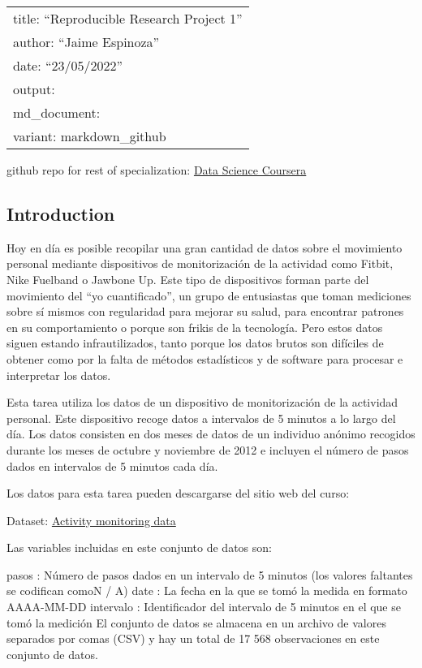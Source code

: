 \documentclass[
]{article}
\author{}
\date{\vspace{-2.5em}}
\begin{document}
\begin{longtable}[]{@{}l@{}}
\toprule
\endhead
title: ``Reproducible Research Project 1'' \\
author: ``Jaime Espinoza'' \\
date: ``23/05/2022'' \\
output: \\
md\_document: \\
variant: markdown\_github \\
\bottomrule
\end{longtable}

github repo for rest of specialization:
\href{https://github.com/jcespinoza2022/datasciencecoursera}{Data
Science Coursera}

\hypertarget{introduction}{%
\subsection{Introduction}\label{introduction}}

Hoy en día es posible recopilar una gran cantidad de datos sobre el
movimiento personal mediante dispositivos de monitorización de la
actividad como Fitbit, Nike Fuelband o Jawbone Up. Este tipo de
dispositivos forman parte del movimiento del ``yo cuantificado'', un
grupo de entusiastas que toman mediciones sobre sí mismos con
regularidad para mejorar su salud, para encontrar patrones en su
comportamiento o porque son frikis de la tecnología. Pero estos datos
siguen estando infrautilizados, tanto porque los datos brutos son
difíciles de obtener como por la falta de métodos estadísticos y de
software para procesar e interpretar los datos.

Esta tarea utiliza los datos de un dispositivo de monitorización de la
actividad personal. Este dispositivo recoge datos a intervalos de 5
minutos a lo largo del día. Los datos consisten en dos meses de datos de
un individuo anónimo recogidos durante los meses de octubre y noviembre
de 2012 e incluyen el número de pasos dados en intervalos de 5 minutos
cada día.

Los datos para esta tarea pueden descargarse del sitio web del curso:

Dataset:
\href{https://d396qusza40orc.cloudfront.net/repdata\%2Fdata\%2Factivity.zip}{Activity
monitoring data}

Las variables incluidas en este conjunto de datos son:

pasos : Número de pasos dados en un intervalo de 5 minutos (los valores
faltantes se codifican como\color{rojo}{\verbo|NA|}N / A) date : La
fecha en la que se tomó la medida en formato AAAA-MM-DD intervalo :
Identificador del intervalo de 5 minutos en el que se tomó la medición
El conjunto de datos se almacena en un archivo de valores separados por
comas (CSV) y hay un total de 17 568 observaciones en este conjunto de
datos.
\end{document}

